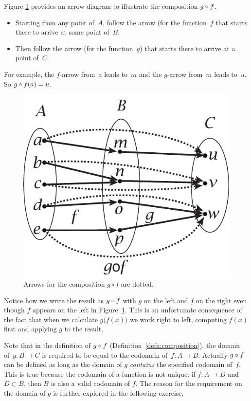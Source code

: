 \begin{example}{}
Figure \ref{arrowcomposefig} provides an arrow diagram to illustrate the composition $g \circ f$.
\begin{itemize}
\item Starting from any point of~$A$, follow the arrow (for the function~$f$ that starts there to arrive at some point of~$B$.
\item Then follow the arrow (for the function~$g$) that starts there to arrive at a point of~$C$.
\end{itemize}
For example, the $f$-arrow from~$a$ leads to~$m$ and the $g$-arrow from~$m$ leads to~$u$. So $g \circ f(a) = u$.
\begin{figure}[h]
\begin{center}
\includegraphics[scale=0.55]{images/arrowcompose.pdf}
\caption{Arrows for the composition $g \circ f$ are dotted.}
\label{arrowcomposefig}
\end{center}
\end{figure}
Notice how we write the result as $g \circ f$ with $g$ on the left and $f$ on the right even though $f$ appears on the left in Figure~\ref{arrowcomposefig}. This is an unfortunate consequence of the fact that when we calculate $g \bigl(f(x) \bigr)$ we work right to left, computing $f(x)$ first and applying $g$ to the result.
\end{example}

Note that in the definition of $g \circ f$ (Definition~\ref{defn:composition}), the domain of~$g:B\rightarrow C$ is required to be equal to the codomain of~$f:A \rightarrow B$. Actually $g \circ f$ can be defined as long as the domain of $g$ \emph{contains} the specified codomain of~$f$. This is true because the codomain of a function is not unique: if $f: A \rightarrow D$ and $D \subset B$, then $B$ is also a valid codomain of $f$. The reason for the requirement on the domain of $g$ is further explored in the following exercise.

